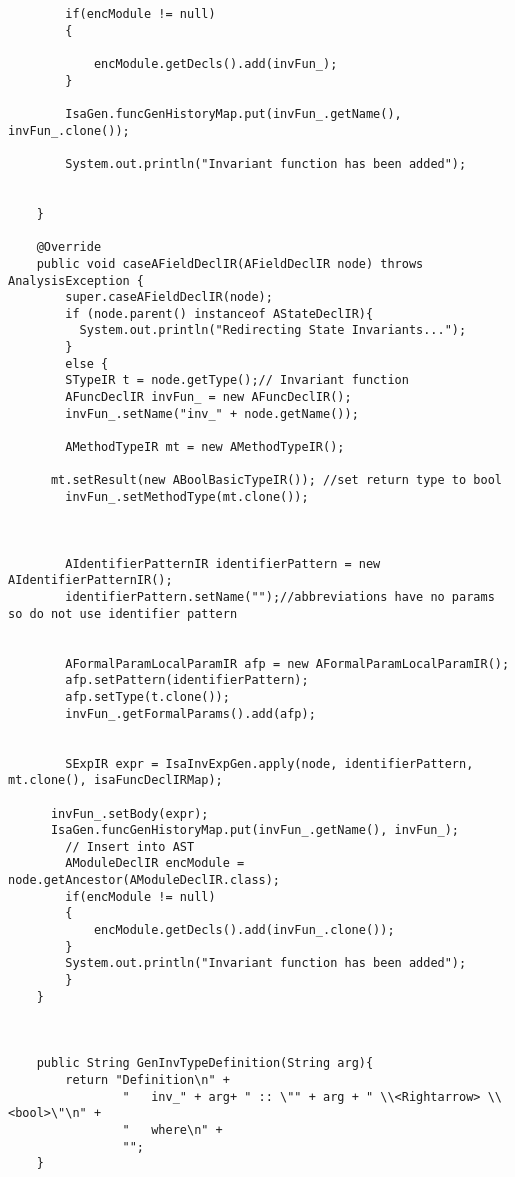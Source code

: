 \begin{appendices}
\begin{lstlisting}
        if(encModule != null)
        {
          
            encModule.getDecls().add(invFun_);
        }

        IsaGen.funcGenHistoryMap.put(invFun_.getName(), invFun_.clone());
        
        System.out.println("Invariant function has been added");

        
    }
    
    @Override
    public void caseAFieldDeclIR(AFieldDeclIR node) throws AnalysisException {
        super.caseAFieldDeclIR(node);
        if (node.parent() instanceof AStateDeclIR){
          System.out.println("Redirecting State Invariants...");
        }
        else {
        STypeIR t = node.getType();// Invariant function
        AFuncDeclIR invFun_ = new AFuncDeclIR();
        invFun_.setName("inv_" + node.getName());
        
        AMethodTypeIR mt = new AMethodTypeIR();
        
      mt.setResult(new ABoolBasicTypeIR()); //set return type to bool
        invFun_.setMethodType(mt.clone());
      
        

        AIdentifierPatternIR identifierPattern = new AIdentifierPatternIR();
        identifierPattern.setName("");//abbreviations have no params so do not use identifier pattern
        
        
        AFormalParamLocalParamIR afp = new AFormalParamLocalParamIR();
        afp.setPattern(identifierPattern);
        afp.setType(t.clone()); 
        invFun_.getFormalParams().add(afp);
      
        
        SExpIR expr = IsaInvExpGen.apply(node, identifierPattern, mt.clone(), isaFuncDeclIRMap);
        
      invFun_.setBody(expr);
      IsaGen.funcGenHistoryMap.put(invFun_.getName(), invFun_);
        // Insert into AST
        AModuleDeclIR encModule = node.getAncestor(AModuleDeclIR.class);
        if(encModule != null)
        {
            encModule.getDecls().add(invFun_.clone());
        }
        System.out.println("Invariant function has been added");
        }
    }
    
   

    public String GenInvTypeDefinition(String arg){
        return "Definition\n" +
                "   inv_" + arg+ " :: \"" + arg + " \\<Rightarrow> \\<bool>\"\n" +
                "   where\n" +
                "";
    }


\end{lstlisting}
\end{appendices}
